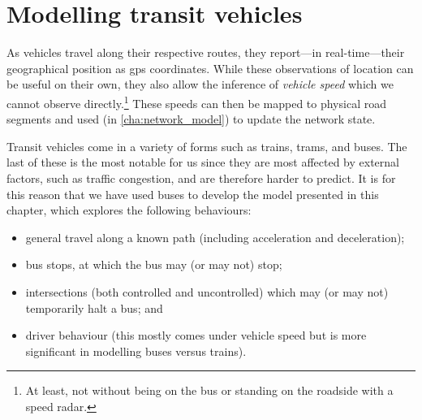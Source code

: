 
\chapter{Modelling transit vehicles}
\label{cha:vehicle_model}

As vehicles travel along their respective routes, they report---in real-time---their geo\-graphical position as \gls{gps} coordinates. While these observations of location can be useful on their own, they also allow the inference of \emph{vehicle speed} which we cannot observe directly.\footnote{At least, not without being on the bus or standing on the roadside with a speed radar.} These speeds can then be mapped to physical road segments and used (in \cref{cha:network_model}) to update the network state.

Transit vehicles come in a variety of forms such as trains, trams, and buses. The last of these is the most notable for us since they are most affected by external factors, such as traffic congestion, and are therefore harder to predict. It is for this reason that we have used buses to develop the model presented in this chapter, which explores the following behaviours:
\begin{itemize}
\item general travel along a known path (including acceleration and deceleration);
\item bus stops, at which the bus may (or may not) stop;
\item intersections (both controlled and uncontrolled) which may (or may not) temporarily halt a bus; and
\item driver behaviour (this mostly comes under vehicle speed but is more significant in modelling buses versus trains).
\end{itemize}


